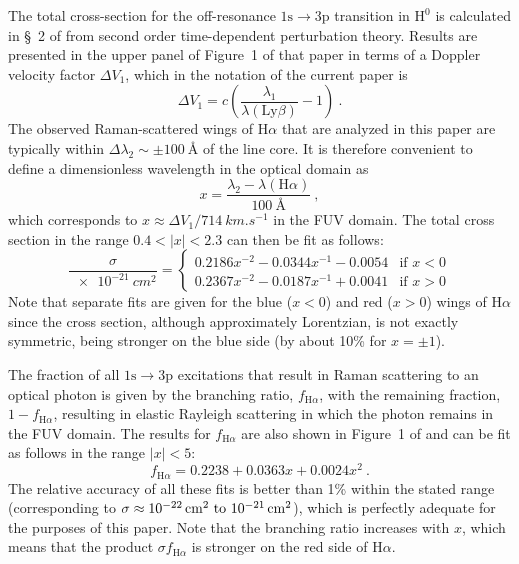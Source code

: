 \documentclass[useAMS, usenatbib, a4paper]{mnras}
\newcommand*\chem[1]{\ensuremath{\mathrm{#1}}}
\newcommand\Config[1]{\ensuremath{\mathrm{#1}}}
\newcommand\ha{\ensuremath{\text{H}\alpha}}
\newcommand\lyb{\ensuremath{\text{Ly}\beta}}
\begin{document}
The total cross-section for the off-resonance \Config{1s \to 3p}
transition in \chem{H^0} is calculated in \S~2 of \citet{Chang:2015a}
from second order time-dependent perturbation theory. Results are
presented in the upper panel of Figure~1 of that paper in terms of a
Doppler velocity factor \(\Delta V_1\), which in the notation of the
current paper is
\begin{equation}
  \label{eq:chang-DeltaV1}
  \Delta V_1 = c \left( \frac{\lambda_1}{\lambda(\lyb)} - 1 \right) \ .
\end{equation}
The observed Raman-scattered wings of \ha{} that are analyzed in this paper
are typically within \(\Delta\lambda_2 \sim \pm \SI{100}{\angstrom}\) of the line
core.  It is therefore convenient to define a dimensionless wavelength
in the optical domain as
\begin{equation}
  \label{eq:x-optical-def}
  x = \frac{\lambda_2 - \lambda(\ha)}{\SI{100}{\angstrom}} \ ,
\end{equation}
which corresponds to \(x \approx \Delta V_1 / \SI{714}{km.s^{-1}}\) in the FUV
domain.  The total cross section in the range \(0.4 < |x| < 2.3\) can
then be fit as follows:
\begin{equation}
  \label{eq:total-cross-section-fit}
  \frac{\sigma}{\SI{e-21}{cm^2}} =  
  \begin{cases}
    0.2186 x^{-2} - 0.0344 x^{-1} - 0.0054 & \text{if \(x < 0\)} \\
    0.2367 x^{-2} - 0.0187 x^{-1} + 0.0041 & \text{if \(x > 0\)} 
  \end{cases}
\end{equation}
Note that separate fits are given for the blue (\(x < 0\)) and red
(\(x > 0\)) wings of \ha{} since the cross section, although
approximately Lorentzian, is not exactly symmetric, being stronger on
the blue side (by about 10\% for \(x = \pm 1\)).

The fraction of all \Config{1s \to 3p} excitations that result in Raman
scattering to an optical photon is given by the branching ratio,
\(f_{\ha}\), with the remaining fraction, \(1 - f_{\ha}\), resulting
in elastic Rayleigh scattering in which the photon remains in the FUV
domain.  The results for \(f_{\ha}\) are also shown in Figure~1 of
\citet{Chang:2015a} and can be fit as follows in the range
\(|x| < 5\):
\begin{equation}
  \label{eq:fha-fit}
  f_{\ha} = 0.2238 + 0.0363 x + 0.0024 x^2 \ .
\end{equation}
The relative accuracy of all these fits is better than 1\% within the
stated range (corresponding to
\(\sigma \approx \text{\SIrange{e-22}{e-21}{cm^2}}\)), which is perfectly
adequate for the purposes of this paper.  Note that the branching
ratio increases with \(x\), which means that the product
\(\sigma f_{\ha} \) is stronger on the red side of \ha{}.





\bsp	%
\label{lastpage}
\end{document}
